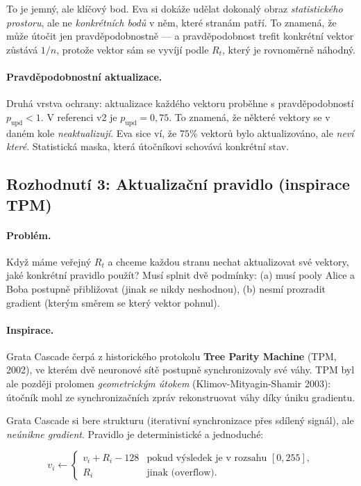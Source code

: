 \documentclass[11pt,a4paper]{article}
\begin{document}
To je jemný, ale klíčový bod. Eva si dokáže udělat dokonalý obraz \emph{statistického prostoru}, ale ne \emph{konkrétních bodů} v něm, které stranám patří. To znamená, že může útočit jen pravděpodobnostně --- a pravděpodobnost trefit konkrétní vektor zůstává $1/n$, protože vektor sám se vyvíjí podle $R_t$, který je rovnoměrně náhodný.

\paragraph{Pravděpodobnostní aktualizace.} Druhá vrstva ochrany: aktualizace každého vektoru proběhne s pravděpodobností $p_\text{upd} < 1$. V referenci v2 je $p_\text{upd} = 0{,}75$. To znamená, že některé vektory se v daném kole \emph{neaktualizují}. Eva sice ví, že $75\%$ vektorů bylo aktualizováno, ale \emph{neví které}. Statistická maska, která útočníkovi schovává konkrétní stav.

\subsection{Rozhodnutí 3: Aktualizační pravidlo (inspirace TPM)}\label{pop:design-update}

\paragraph{Problém.} Když máme veřejný $R_t$ a chceme každou stranu nechat aktualizovat své vektory, jaké konkrétní pravidlo použít? Musí splnit dvě podmínky: (a) musí pooly Alice a Boba postupně přibližovat (jinak se nikdy neshodnou), (b) nesmí prozradit gradient (kterým směrem se který vektor pohnul).

\paragraph{Inspirace.} Grata Cascade čerpá z historického protokolu \textbf{Tree Parity Machine} (TPM, 2002), ve kterém dvě neuronové sítě postupně synchronizovaly své váhy. TPM byl ale později prolomen \emph{geometrickým útokem} (Klimov-Mityagin-Shamir 2003): útočník mohl ze synchronizačních zpráv rekonstruovat váhy díky úniku gradientu.

Grata Cascade si bere strukturu (iterativní synchronizace přes sdílený signál), ale \emph{neúnikne gradient}. Pravidlo je deterministické a jednoduché:

\[
v_i \gets \begin{cases} v_i + R_i - 128 & \text{pokud výsledek je v rozsahu } [0, 255], \\ R_i & \text{jinak (overflow)}. \end{cases}
\]
\end{document}
